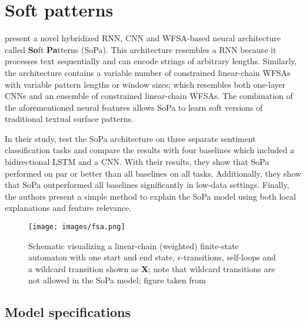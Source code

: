 \section{Soft patterns}

\label{section:soft-patterns}

\citet{schwartz2018sopa} present a novel hybridized RNN, CNN and WFSA-based neural architecture called \textbf{So}ft \textbf{Pa}tterns (SoPa). This architecture resembles a RNN because it processes text sequentially and can encode strings of arbitrary lengths. Similarly, the architecture contains a variable number of constrained linear-chain WFSAs with variable pattern lengths or window sizes; which resembles both one-layer CNNs and an ensemble of constrained linear-chain WFSAs. The combination of the aforementioned neural features allows SoPa to learn soft versions of traditional textual surface patterns.

In their study, \citet{schwartz2018sopa} test the SoPa architecture on three separate sentiment classification tasks and compare the results with four baselines which included a bidirectional LSTM and a CNN. With their results, they show that SoPa performed on par or better than all baselines on all tasks. Additionally, they show that SoPa outperformed all baselines significantly in low-data settings. Finally, the authors present a simple method to explain the SoPa model using both local explanations and feature relevance.

\begin{figure}[t]
  \centering
  \texttt{[image: images/fsa.png]}
  \caption{Schematic visualizing a linear-chain (weighted) finite-state automaton with one start and end state, $\epsilon$-transitions, self-loops and a wildcard transition shown as \textbf{X}; note that wildcard transitions are not allowed in the SoPa model; figure taken from \citet{schwartz2018sopa}}
  \label{fig:fsa}
\end{figure}

\subsection{Model specifications}

